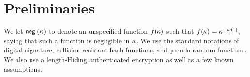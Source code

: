 \section{Preliminaries}\label{sec:pre}
We let ${\mathsf{negl}}(\kappa)$ to denote an unspecified
function $f(\kappa)$ such that
$f(\kappa) ={\kappa}^{-\omega(1)}$, saying that such a
function is negligible in $\kappa$.
We use the standard notations of digital signature,
collision-resistant hash functions, and pseudo random
functions.
We also use a length-Hiding authenticated encryption as well as a few
known assumptions.


